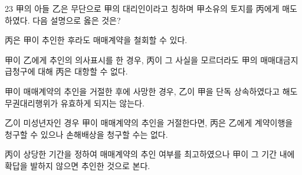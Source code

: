 \begin{question}{23}
甲의 아들 乙은 무단으로 甲의 대리인이라고 칭하며 甲소유의 토지를 丙에게 매도하였다. 다음 설명으로 옳은 것은?
\begin{choices}
  \item 丙은 甲이 추인한 후라도 매매계약을 철회할 수 있다.
  \item 甲이 乙에게 추인의 의사표시를 한 경우, 丙이 그 사실을 모르더라도 甲의 매매대금지급청구에 대해 丙은 대항할 수 없다.
  \item 甲이 매매계약의 추인을 거절한 후에 사망한 경우, 乙이 甲을 단독 상속하였다고 해도 무권대리행위가 유효하게 되지는 않는다.
  \item 乙이 미성년자인 경우 甲이 매매계약의 추인을 거절한다면, 丙은 乙에게 계약이행을 청구할 수 있으나 손해배상을 청구할 수는 없다.
  \item 丙이 상당한 기간을 정하여 매매계약의 추인 여부를 최고하였으나 甲이 그 기간 내에 확답을 발하지 않으면 추인한 것으로 본다.
\end{choices}
\end{question}
